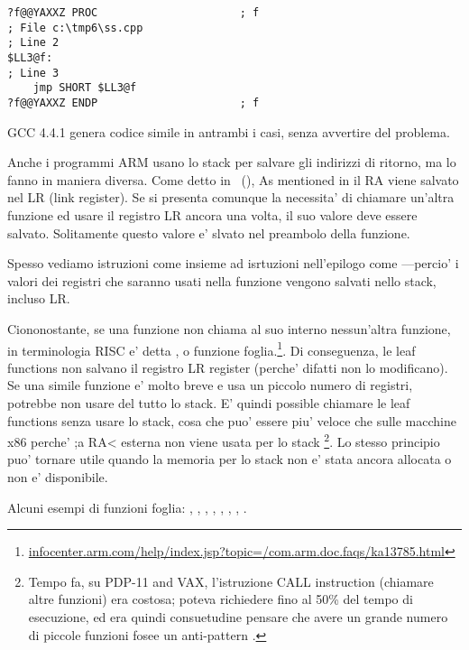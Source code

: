 \begin{lstlisting}
?f@@YAXXZ PROC						; f
; File c:\tmp6\ss.cpp
; Line 2
$LL3@f:
; Line 3
	jmp	SHORT $LL3@f
?f@@YAXXZ ENDP						; f
\end{lstlisting}

GCC 4.4.1 genera codice simile in antrambi i casi, senza avvertire del problema.


Anche i programmi ARM usano lo stack per salvare gli indirizzi di ritorno, ma lo fanno in maniera diversa.
Come detto in \q{\HelloWorldSectionName}~(),
As mentioned in 
il \ac{RA} viene salvato nel \ac{LR} (\gls{link register}).
Se si presenta comunque la necessita' di chiamare un'altra funzione ed usare il registro \ac{LR} ancora una volta, 
il suo valore deve essere salvato.
Solitamente questo valore e' slvato nel preambolo della funzione.

Spesso vediamo istruzioni come  insieme ad isrtuzioni nell'epilogo come 
---percio' i valori dei registri che saranno usati nella funzione vengono salvati nello stack, incluso \ac{LR}.

Ciononostante, se una funzione non chiama al suo interno nessun'altra funzione, in terminologia \ac{RISC} e' detta 
, o funzione foglia.\footnote{\href{http://go.yurichev.com/17064}{infocenter.arm.com/help/index.jsp?topic=/com.arm.doc.faqs/ka13785.html}}. 
Di conseguenza, le leaf functions non salvano il registro \ac{LR} register (perche' difatti non lo modificano).
Se una simile funzione e' molto breve e usa un piccolo numero di registri, potrebbe non usare del tutto lo stack. 
E' quindi possible chiamare le leaf functions senza usare lo stack, cosa che puo' essere piu' veloce che sulle macchine x86 perche' ;a RA< esterna non viene usata per lo stack
\footnote{Tempo fa, su PDP-11 and VAX, l'istruzione CALL instruction (chiamare altre funzioni) era costosa; poteva richiedere fino al 50\%
del tempo di esecuzione, ed era quindi consuetudine pensare che avere un grande numero di piccole funzioni fosee un \gls{anti-pattern} .}.
Lo stesso principio puo' tornare utile quando la memoria per lo stack non e' stata ancora allocata o non e' disponibile.

Alcuni esempi di funzioni foglia:
, , 
, , ,
, , .
